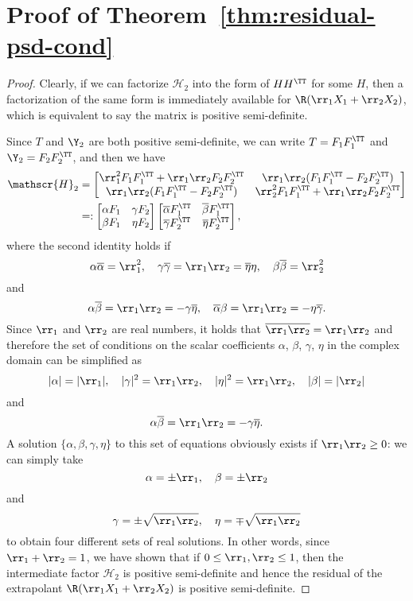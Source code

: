 \section{Proof of Theorem~\ref{thm:residual-psd-cond}}\label{append:proof-residual-psd-cond}
\begin{proof}
Clearly, if we can factorize $\mathscr{H}_2$ into the form of
$HH^\TT$ for some $H$, then a factorization of the same form is immediately available for $\R(\rr_1X_1 + \rr_2X_2)$, which is equivalent to say the matrix is positive semi-definite.

Since $T$ and $\Y_2$ are both positive semi-definite, we can write $T = F_1F_1^\TT$ and $\Y_2 = F_2F_2^\TT$, and then we have
\begin{align*}
	\mathscr{H}_2  &=
	\begin{bmatrix}
		\rr_1^2F_1F_1^\TT+\rr_1\rr_2F_2F_2^\TT & \rr_1\rr_2(F_1F_1^\TT-F_2F_2^\TT) \\
		\rr_1\rr_2(F_1F_1^\TT-F_2F_2^\TT)    &  \rr_2^2 F_1F_1^\TT +\rr_1\rr_2F_2F_2^\TT
	\end{bmatrix} \\
	& =: \begin{bmatrix}
		\alpha F_1 & \gamma F_2 \\
		\beta F_1    &  \eta F_2
	\end{bmatrix}
	\begin{bmatrix}
		\overline{\alpha} F_1^\TT & \overline{\beta} F_1^\TT \\
		\overline{\gamma} F_2^\TT    &  \overline{\eta} F_2^\TT
	\end{bmatrix},
\end{align*}
where the second identity holds if
\[
\alpha\overline{\alpha} = \rr_1^2,\quad \gamma\overline{\gamma} =\rr_1\rr_2= \overline{\eta}\eta ,\quad
\beta\overline{\beta} = \rr_2^2
\]
and
\[
\alpha \overline{\beta} = \rr_1\rr_2 = -\gamma\overline{\eta}, \quad
\overline{\alpha} \beta = \rr_1\rr_2 = -\eta\overline{\gamma}.
\]
Since $\rr_1$ and $\rr_2$ are real numbers, it holds that
$\overline{\rr_1\rr_2} = \rr_1\rr_2$ and therefore the set of conditions on the scalar coefficients
$\alpha$, $\beta$, $\gamma$, $\eta$ in the complex domain can be simplified as
\begin{equation*}
	|\alpha| = |\rr_1|,\quad
	|\gamma|^2 =  \rr_1\rr_2,\quad
	|\eta|^2 =\rr_1\rr_2,\quad
	|\beta| = |\rr_2|
\end{equation*}
and
\[
\alpha \overline{\beta} = \rr_1\rr_2 = -\gamma\overline{\eta}.
\]
A solution $\{\alpha, \beta, \gamma, \eta\}$ to this set of equations obviously exists if $\rr_1\rr_2\ge 0$: we can simply take
\[
\alpha = \pm \rr_1,\quad
\beta = \pm \rr_2
\]
and
\[
\gamma = \pm \sqrt{\rr_1\rr_2},\quad
\eta = \mp \sqrt{\rr_1\rr_2}
\]
to obtain four different sets of real solutions. In other words, since $\rr_1+\rr_2=1$, we have shown that if $0\le \rr_1,\rr_2 \le 1$, then the intermediate factor $\mathscr{H}_2$ is positive semi-definite and hence the residual of the extrapolant
$\R(\rr_1X_1 + \rr_2X_2)$ is positive semi-definite.


\end{proof}
